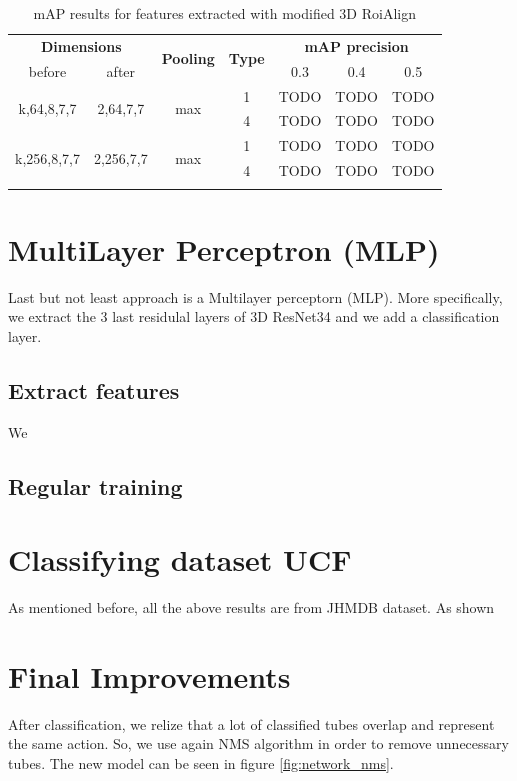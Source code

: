 \documentclass{report}
\begin{document}
\begin{center}
\begin{longtable}{||c | c| c| c||c c c||}

  \hline
 \multicolumn{2}{||c|}{\textbf{Dimensions}} & \multirow{2}{*}{\textbf{Pooling}} &\multirow{2}{*}{ \textbf{Type}} &\multicolumn{3}{|c||}{\textbf{mAP precision}}\\

  before & after & {} & {} & 0.3 &  0.4 & 0.5 \\
  \hline   \hline

  \multirow{2}{*}{k,64,8,7,7} & \multirow{2}{*}{2,64,7,7} & \multirow{2}{*}{max}  & 1 & TODO & TODO & TODO \\
  \cline{4-7}
  {} & {} & {} & 4 & TODO & TODO & TODO   \\
  \hline   
  \multirow{2}{*}{k,256,8,7,7} & \multirow{2}{*}{2,256,7,7} & \multirow{2}{*}{max}  & 1 & TODO & TODO & TODO \\
  \cline{4-7}
  {} & {} & {} & 4 & TODO & TODO & TODO   \\
  \hline   
  \caption{mAP results for features extracted with modified 3D RoiAlign }
  \label{table:svm_mod_roialign}

\end{longtable} 
\end{center}

\section{MultiLayer Perceptron (MLP)}
Last but not least approach is a Multilayer perceptorn (MLP). More specifically, we extract the 3 last residulal layers of 3D ResNet34
and we add a classification layer.  

\subsection{Extract features}
We

\subsection{Regular training}

\section{Classifying dataset UCF}
As mentioned before, all the above results are from JHMDB dataset. As shown
\section{Final Improvements}
After classification, we relize that a lot of classified tubes overlap and represent the same action. So, we use again NMS algorithm in order
to remove unnecessary tubes. The new model can be seen in figure \ref{fig:network_nms}.
\end{document}
